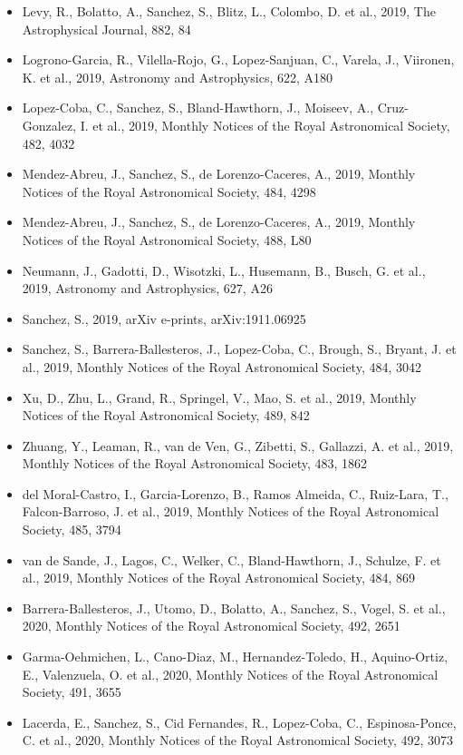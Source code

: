 \documentclass{letter}
\begin{document}
\begin{enumerate}
\begin{itemize}
\item Levy, R., Bolatto, A., Sanchez, S., Blitz, L., Colombo, D. et al., 2019, The Astrophysical Journal, 882, 84
\item Logrono-Garcia, R., Vilella-Rojo, G., Lopez-Sanjuan, C., Varela, J., Viironen, K. et al., 2019, Astronomy and Astrophysics, 622, A180
\item Lopez-Coba, C., Sanchez, S., Bland-Hawthorn, J., Moiseev, A., Cruz-Gonzalez, I. et al., 2019, Monthly Notices of the Royal Astronomical Society, 482, 4032
\item Mendez-Abreu, J., Sanchez, S., de Lorenzo-Caceres, A., 2019, Monthly Notices of the Royal Astronomical Society, 484, 4298
\item Mendez-Abreu, J., Sanchez, S., de Lorenzo-Caceres, A., 2019, Monthly Notices of the Royal Astronomical Society, 488, L80
\item Neumann, J., Gadotti, D., Wisotzki, L., Husemann, B., Busch, G. et al., 2019, Astronomy and Astrophysics, 627, A26
\item Sanchez, S., 2019, arXiv e-prints, arXiv:1911.06925
\item Sanchez, S., Barrera-Ballesteros, J., Lopez-Coba, C., Brough, S., Bryant, J. et al., 2019, Monthly Notices of the Royal Astronomical Society, 484, 3042
\item Xu, D., Zhu, L., Grand, R., Springel, V., Mao, S. et al., 2019, Monthly Notices of the Royal Astronomical Society, 489, 842
\item Zhuang, Y., Leaman, R., van de Ven, G., Zibetti, S., Gallazzi, A. et al., 2019, Monthly Notices of the Royal Astronomical Society, 483, 1862
\item del Moral-Castro, I., Garcia-Lorenzo, B., Ramos Almeida, C., Ruiz-Lara, T., Falcon-Barroso, J. et al., 2019, Monthly Notices of the Royal Astronomical Society, 485, 3794
\item van de Sande, J., Lagos, C., Welker, C., Bland-Hawthorn, J., Schulze, F. et al., 2019, Monthly Notices of the Royal Astronomical Society, 484, 869
\item Barrera-Ballesteros, J., Utomo, D., Bolatto, A., Sanchez, S., Vogel, S. et al., 2020, Monthly Notices of the Royal Astronomical Society, 492, 2651
\item Garma-Oehmichen, L., Cano-Diaz, M., Hernandez-Toledo, H., Aquino-Ortiz, E., Valenzuela, O. et al., 2020, Monthly Notices of the Royal Astronomical Society, 491, 3655
\item Lacerda, E., Sanchez, S., Cid Fernandes, R., Lopez-Coba, C., Espinosa-Ponce, C. et al., 2020, Monthly Notices of the Royal Astronomical Society, 492, 3073

\end{itemize}
\end{enumerate}
\end{document}
